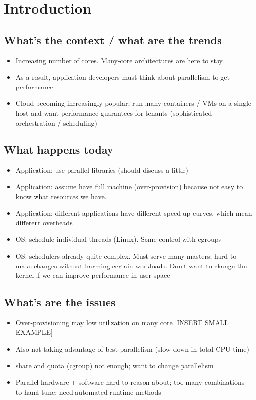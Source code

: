 \section{Introduction}
\subsection*{What's the context / what are the trends}
\begin{itemize}
  \item Increasing number of cores. Many-core architectures are here to stay. \cite{baumann2009multikernel}
  \item As a result, application developers must think about parallelism to get performance
  \item Cloud becoming increasingly popular; run many containers / VMs on a single host and want performance guarantees for tenants (sophisticated orchestration / scheduling)
\end{itemize}
\subsection*{What happens today}
\begin{itemize}
  \item Application: use parallel libraries (should discuss a little)
  \item Application: assume have full machine (over-provision) because not easy to know what resources we have.
  \item Application: different applications have different speed-up curves, which mean different overheads
  \item OS: schedule individual threads (Linux). Some control with cgroups
  \item OS: schedulers already quite complex. Must serve many masters; hard to make changes without harming certain workloads. Don't want to change the kernel if we can improve performance in user space \cite{lozi2016linux}
\end{itemize}
\subsection*{What's are the issues}
\begin{itemize}
  \item Over-provisioning may low utilization on many core [INSERT SMALL EXAMPLE]
  \item Also not taking advantage of best parallelism (slow-down in total CPU time)
  \item share and quota (cgroup) not enough; want to change parallelism
  \item Parallel hardware + software hard to reason about; too many combinations to hand-tune; need automated runtime methods
\end{itemize}
